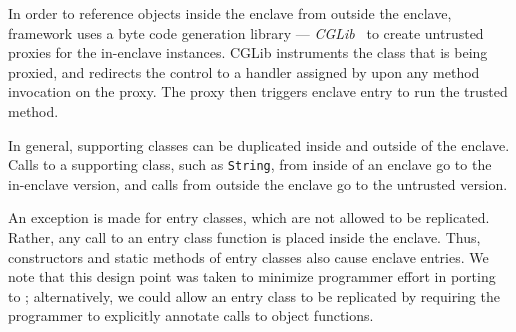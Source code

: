 

In order to reference objects inside the enclave from outside the enclave,
\sysname{} framework uses a byte code generation library --- {\em CGLib}~\cite{cglib} to create untrusted proxies for the in-enclave instances.
CGLib instruments the class that is being proxied,
and redirects the control to a handler 
assigned by \sysname{} upon any method invocation on the proxy.
The proxy then triggers enclave entry to run the trusted method.



 
In general, supporting classes can be duplicated inside and outside of the enclave.
Calls to a supporting class, such as {\tt String}, from inside of an enclave
go to the in-enclave version, and calls from outside the enclave go to the untrusted version.

An exception is made for entry classes, which are not allowed to be replicated.
Rather, any call to an entry class function is placed inside the enclave.
Thus, constructors and static methods of entry classes also cause enclave entries.
We note that this design point was taken to minimize programmer effort in porting to \sgx{};
alternatively, we could allow an entry class to be replicated by requiring the programmer to 
explicitly annotate calls to object functions.

